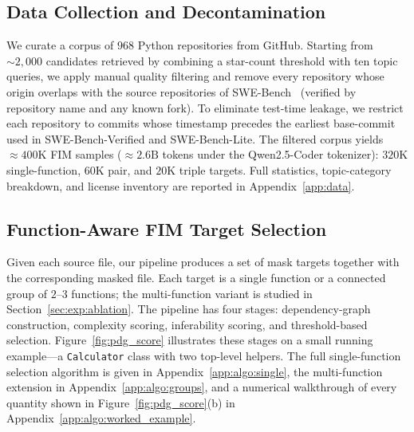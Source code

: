 \vspace{-0.5ex}
\subsection{Data Collection and Decontamination}
\label{sec:method:data}

We curate a corpus of $968$ Python repositories from GitHub. Starting
from $\sim\!2{,}000$ candidates retrieved by combining a star-count
threshold with ten topic queries, we apply manual quality filtering and
remove every repository whose origin overlaps with the source
repositories of SWE-Bench~\citep{swebench} (verified by repository name
and any known fork). To eliminate test-time leakage, we restrict each
repository to commits whose timestamp precedes the earliest base-commit
used in SWE-Bench-Verified and SWE-Bench-Lite. The filtered corpus
yields $\approx\!400\mathrm{K}$ FIM samples ($\approx\!2.6\mathrm{B}$
tokens under the Qwen2.5-Coder tokenizer): $320\mathrm{K}$
single-function, $60\mathrm{K}$ pair, and $20\mathrm{K}$ triple targets.
Full statistics, topic-category breakdown, and license inventory are
reported in Appendix~\ref{app:data}.

\vspace{-0.5ex}
\subsection{Function-Aware FIM Target Selection}
\label{sec:method:selection}

Given each source file, our pipeline produces a set of mask targets
together with the corresponding masked file. Each target is a single
function or a connected group of $2$--$3$ functions; the multi-function
variant is studied in Section~\ref{sec:exp:ablation}. The pipeline has
four stages: dependency-graph construction, complexity scoring,
inferability scoring, and threshold-based selection. Figure~\ref{fig:pdg_score}
illustrates these stages on a small running example---a
\texttt{Calculator} class with two top-level helpers. The full
single-function selection algorithm is given in
Appendix~\ref{app:algo:single}, the multi-function extension in
Appendix~\ref{app:algo:groups}, and a numerical walkthrough of every
quantity shown in Figure~\ref{fig:pdg_score}(b) in
Appendix~\ref{app:algo:worked_example}.

